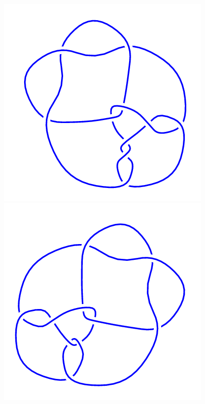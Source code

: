 \begin{figure}[H]
    \begin{minipage}[b]{.18\linewidth}
        \centering
        \includegraphics[width=\linewidth]{../data/10_152.png}
    \end{minipage}
    \begin{minipage}[b]{.18\linewidth}
        \centering
        \includegraphics[width=\linewidth]{../data/10_153.png}

\end{minipage}
\end{figure}
